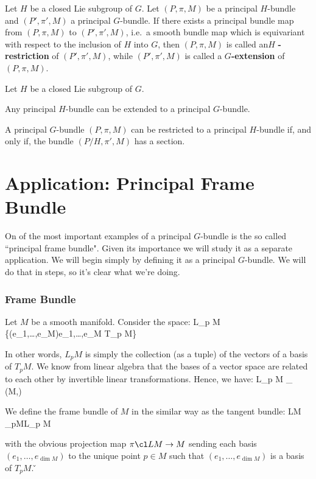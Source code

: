 Let $H$ be a closed Lie subgroup of $G$. Let $(P,\pi,M)$ be a principal $H$-bundle and $(P',\pi',M)$ a principal
$G$-bundle. If there exists a principal bundle map from $(P,\pi,M)$ to $(P', \pi',M)$, i.e.\ a smooth bundle map
which is equivariant with respect to the inclusion of $H$ into $G$, then $(P,\pi, M)$ is called an$H$
\textbf{-restriction} of $(P',\pi',M)$, while $(P',\pi',M)$ is called a $G$\textbf{-extension} of $(P,\pi,M)$.
\ed

\bt[]
Let $H$ be a closed Lie subgroup of $G$.
\ben[label=\roman*)]
\item Any principal $H$-bundle can be extended to a principal $G$-bundle.
\item A principal $G$-bundle $(P,\pi,M)$ can be restricted to a principal $H$-bundle if, and only if, the bundle
$(P/H,\pi',M)$ has a section.
\een
\et

\section{Application: Principal Frame Bundle}

On of the most important examples of a principal $G$-bundle is the so called ``principal frame bundle". Given its
importance we will study it as a separate application. We will begin simply by defining it as a principal $G$-bundle.
We will do that in steps, so it's clear what we're doing.

\subsubsection*{Frame Bundle}

Let $M$ be a smooth manifold. Consider the space:
\bse
L_p M \coloneqq \{(e_1,\ldots,e_{\dim M})\mid e_1,\ldots,e_{\dim M} T_p M\}
\ese

In other words, $L_p M$ is simply the collection (as a tuple) of the vectors of a basis of $T_p M$. We know from
linear algebra that the bases of a vector space are related to each other by invertible linear transformations.
Hence, we have:
\bse
L_p M \cong_{} \GL(\dim M,\R)
\ese

We define the frame bundle of $M$ in the similar way as the tangent bundle:
\bse
LM \coloneqq \dot{\bigcup}_{p\in M}L_p M
\ese

with the obvious projection map $\pi\cl LM \to M$ sending each basis $(e_1, \ldots,e_{\dim M})$ to the unique point
$p\in M$ such that $(e_1,\ldots,e_{\dim M})$ is a basis of $T_p M$. \v

